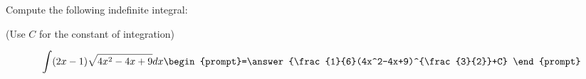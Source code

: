 \documentclass{ximera}
\author{Jim Talamo}
\begin{document}
\begin{exercise}
Compute the following indefinite integral:

\begin{prompt} (Use $C$ for the constant of integration) \end{prompt}

\[
\int (2x-1)\sqrt{4x^2-4x+9} dx 
\begin{prompt}=\answer{\frac{1}{6}(4x^2-4x+9)^{\frac{3}{2}}+C} \end{prompt}
\]
\end{exercise}
\end{document}
